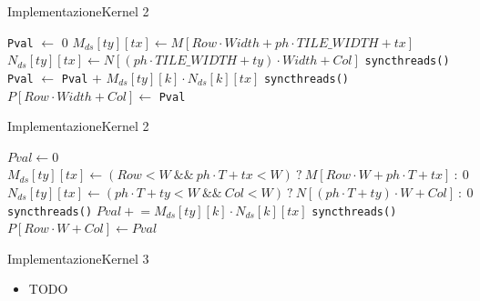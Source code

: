 \documentclass{beamer}
\begin{document}
\begin{frame}{Implementazione}{Kernel 2}
    \begin{algorithm}[H]
    \caption{Tiled Matrix Multiplication Kernel 2}
    \begin{algorithmic}[1]
    \State \texttt{Pval} $\gets$ 0
        \State $M_{ds}[ty][tx] \gets M[Row \cdot Width + ph \cdot TILE\_WIDTH + tx]$
        \State $N_{ds}[ty][tx] \gets N[(ph \cdot TILE\_WIDTH + ty) \cdot Width + Col]$
        \State \texttt{syncthreads()}
            \State \texttt{Pval} $\gets$ \texttt{Pval} $+$ $M_{ds}[ty][k] \cdot N_{ds}[k][tx]$
        \EndFor
        \State \texttt{syncthreads()}
    \EndFor
    \State $P[Row \cdot Width + Col] \gets$ \texttt{Pval}
    \end{algorithmic}
    \end{algorithm}
\end{frame}

\begin{frame}{Implementazione}{Kernel 2}
\begin{algorithm}[H]
\scriptsize
\caption{Tiled Matrix Multiplication Kernel 2 con padding}
\begin{algorithmic}[1]
\State $Pval \gets 0$
  \State $M_{ds}[ty][tx] \gets (Row<W~\&\&~ph\cdot T+tx<W)~?~M[Row\cdot W + ph\cdot T + tx]~:~0$
  \State $N_{ds}[ty][tx] \gets (ph\cdot T+ty<W~\&\&~Col<W)~?~N[(ph\cdot T+ty)\cdot W + Col]~:~0$
  \State \texttt{syncthreads()}
    \State $Pval \mathrel{+}= M_{ds}[ty][k] \cdot N_{ds}[k][tx]$
  \EndFor
  \State \texttt{syncthreads()}
\EndFor
{}
  \State $P[Row\cdot W + Col] \gets Pval$
\EndIf
\end{algorithmic}
\end{algorithm}
\end{frame}

\begin{frame}{Implementazione}{Kernel 3}
    \begin{itemize}
        \item TODO
    \end{itemize}
\end{frame}
\end{document}
